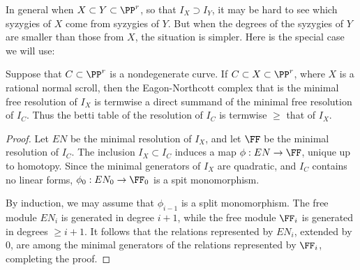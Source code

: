 
In general when $X\subset Y\subset \PP^r$, so that $I_X \supset I_Y$, it may be hard to see which syzygies of $X$ come
from syzygies of $Y$. But when the degrees of the syzygies of $Y$ are smaller than those from $X$, the situation is simpler.
Here is the special case we will use:

\begin{proposition}
Suppose that $C\subset \PP^r$ is a nondegenerate curve. If $C\subset X \subset \PP^r$, where $X$ is a rational
normal scroll, then the Eagon-Northcott complex that is  the minimal free resolution of $I_X$ is termwise a direct summand
of the minimal free resolution of $I_C$. Thus the betti table of the resolution of $I_C$ is termwise $\geq$ that of $I_X$.
\end{proposition}

\begin{proof}
Let $EN$ be the minimal resolution of $I_X$, and let $\FF$ be the minimal resolution of $I_C$.
The inclusion $I_X \subset I_C$ induces a map $\phi: EN\to \FF$, unique up to homotopy. Since the minimal generators of $I_X$ are quadratic, and $I_C$ contains no linear forms, $\phi_0: EN_0\to \FF_0$ is a spit monomorphism.

By induction, we may assume that $\phi_{i-1}$ is a split monomorphism. The free module $EN_{i}$ is generated in 
degree $i+1$, while the free module $\FF_i$ is generated in degrees $\geq i+1$. It follows that the relations
represented by $EN_i$, extended by 0, are among the minimal generators of the relations represented by $\FF_i$,
completing the proof.
 \end{proof}
 


